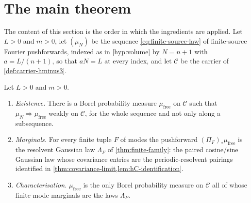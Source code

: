 %
%
\section{The main theorem}\label{sec:main}

The content of this section is the order in which the ingredients are applied.
Let $L>0$ and $m>0$, let
$(\mu_N)$ be the sequence \eqref{eq:finite-source-law} of finite-source Fourier
pushforwards, indexed as in \cref{hyp:volume} by $N=n+1$ with $a=L/(n+1)$, so
that $aN=L$ at every index, and let $\mathcal C$ be the carrier of
\cref{def:carrier-hminus3}.

\begin{theorem}\label{thm:main}
Let $L>0$ and $m>0$.
\begin{enumerate}
\item[(i)] \emph{Existence.} There is a Borel probability measure
  $\mu_{\mathrm{free}}$ on $\mathcal C$ such that $\mu_N\Rightarrow
  \mu_{\mathrm{free}}$ weakly on $\mathcal C$, for the whole sequence and not
  only along a subsequence.
\item[(ii)] \emph{Marginals.} For every finite tuple $F$ of modes the pushforward
  $(\Pi_F)_*\mu_{\mathrm{free}}$ is the resolvent Gaussian law $\Lambda_F$ of
  \cref{thm:finite-family}: the paired cosine/sine Gaussian law whose covariance
  entries are the periodic-resolvent pairings identified in
  \cref{thm:covariance-limit,lem:hC-identification}.
\item[(iii)] \emph{Characterisation.} $\mu_{\mathrm{free}}$ is the only Borel
  probability measure on $\mathcal C$ all of whose finite-mode marginals are the
  laws $\Lambda_F$.
\end{enumerate}
\end{theorem}


